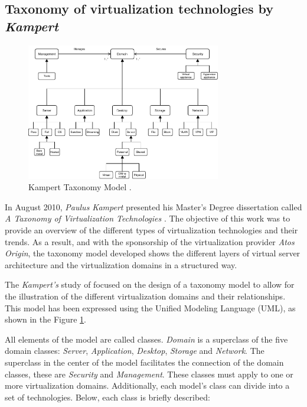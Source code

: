 	\subsection{Taxonomy of virtualization technologies by \textit{Kampert}}
	
	\begin{figure}[H]
		\centering
		\includegraphics[width=8.5cm]{images/Kampert2010.pdf}
		\vspace{0.2mm}
		\caption{Kampert Taxonomy Model \cite{Kampert2010}.}
		\label{fig:KampertTaxonomyModel2010}
	\end{figure}
	
	In August 2010, \textit {Paulus Kampert} presented his Master's Degree dissertation called \textit{A Taxonomy of Virtualization Technologies} \cite{Kampert2010}. The objective of this work was to provide an overview of the different types of virtualization technologies and their trends. As a result, and with the sponsorship of the virtualization provider \textit{Atos Origin}, the taxonomy model developed shows the different layers of virtual server architecture and the virtualization domains in a structured way.
	
	The \textit{Kampert's} study of focused on the design of a taxonomy model to allow for the illustration of the different virtualization domains and their relationships. This model has been expressed using the Unified Modeling Language (UML), as shown in the Figure \ref{fig:KampertTaxonomyModel2010}.
	
	All elements of the model are called classes. \textit{Domain} is a superclass of the five domain classes: \textit{Server}, \textit{Application}, \textit{Desktop}, \textit {Storage} and \textit {Network}. The superclass in the center of the model facilitates the connection of the domain classes,
	these are \textit{Security} and \textit {Management}. These classes must apply to one or more virtualization domains. Additionally, each model's class can divide into a set of technologies. Below, each class is briefly described:

